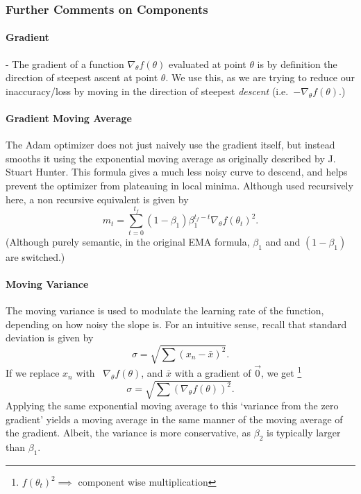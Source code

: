 \documentclass[titlepage,letterpaper]{article}
\begin{document}
\subsubsection{Further Comments on Components}



\paragraph{Gradient} - The gradient of a function $\nabla_\theta f(\theta)$ evaluated at point $\theta$ is by definition the direction of steepest ascent at point $\theta$. We use this, as we are trying to reduce our inaccuracy/loss by moving in the direction of steepest \textit{descent} \mbox{(i.e. $-\nabla_\theta f(\theta).$)} \cite{gradient} 

\paragraph{Gradient Moving Average}
The Adam optimizer does not just naively use the gradient itself, but instead smooths it using the exponential moving average as originally described by J. Stuart Hunter.\cite{EMA} This formula gives a much less noisy curve to descend, and helps prevent the optimizer from plateauing in local minima. Although used recursively here, a non recursive equivalent is given by
\[m_t = \sum_{t=0}^{t_f} \left(1-\beta_1\right) \beta_1^{t_f-t}\nabla_\theta f\left(\theta_{t}\right)^2.\]
(Although purely semantic, in the original EMA formula, \(\beta_1\) and and \(\left(1-\beta_1\right)\) are switched.)

\paragraph{Moving Variance}
The moving variance is used to modulate the learning rate of the function, depending on how noisy the slope is. For an intuitive sense, 
recall that standard deviation is given by
\[\sigma = \sqrt{\sum \left(x_n - \bar{x}\right)^2}.\]
If we replace \(x_n\) with \ \(\nabla_\theta f(\theta)\), and \(\bar{x}\) with a gradient of \(\vec{0}\), we get \footnote{\(f\left(\theta_{t}\right)^2 \implies \) component wise multiplication}
\[\sigma = \sqrt{\sum \left(\nabla_\theta f(\theta)\right)^2}.\]
Applying the same exponential moving average to this `variance from the zero gradient' yields a moving average in the same manner of the moving average of the gradient. Albeit, the variance is more conservative, as \(\beta_2\) is typically larger than \(\beta_1\)\cite{adam}.
\end{document}
